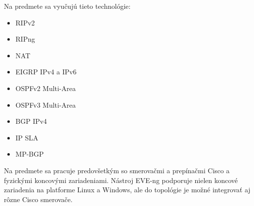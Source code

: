 Na predmete sa vyučujú tieto technológie:

\begin{itemize}[noitemsep]
    \item RIPv2
    \item RIPng
    \item NAT
    \item EIGRP IPv4 a IPv6
    \item OSPFv2 Multi-Area
    \item OSPFv3 Multi-Area
    \item BGP IPv4
    \item IP SLA
    \item MP-BGP
\end{itemize}

Na predmete sa pracuje predovšetkým so smerovačmi a prepínačmi Cisco a fyzickými koncovými zariadeniami. Nástroj EVE-ng podporuje nielen koncové zariadenia na platforme Linux a Windows, ale do topológie je možné integrovať aj rôzne Cisco smerovače.
